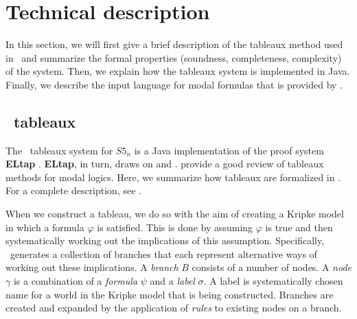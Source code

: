 \section{Technical description}
\label{sec:technical}

In this section, we will first give a brief description of the tableaux method
used in \oops\ and summarize the formal properties (soundness, completeness,
complexity) of the system. Then, we explain how the
tableaux system is implemented in Java. Finally, we describe the input language
for modal formulas that is provided by \oops.

\subsection{\oops\ tableaux}
\label{sec:tableaux}

The \oops\ tableaux system for $S5_n$ is a Java \citep{gosling2005}
implementation of the proof system {\bf ELtap} \citep{deboer2006}.  {\bf
ELtap}, in turn, draws on \citet{fitting1999} and \citet{beckert1997}.
\citet{halpern1992} provide a good review of tableaux methods for modal logics.
Here, we summarize how tableaux are formalized in \oops. For a complete
description, see \citet{valkenhoef2008}.

When we construct a tableau, we do so with the aim of creating a Kripke model
in which a formula $\varphi$ is satisfied. This is done by assuming $\varphi$
is true and then systematically working out the implications of this
assumption. Specifically, \oops\ generates a collection of branches that each
represent alternative ways of working out these implications. A {\em branch}
$B$ consists of a number of nodes. A {\em node} $\gamma$ is a combination of a
{\em formula} $\psi$ and a {\em label} $\sigma$. A label is systematically
chosen name for a world in the Kripke model that is being constructed. Branches
are created and expanded by the application of {\em rules} to existing nodes on
a branch. 



